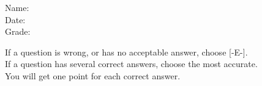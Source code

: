 \documentclass[11pt,fleqn]{article}
\begin{document}
\pagestyle{fancy}

\vspace*{-1in}
\begin{flushright}
Name: \uline{\mbox{\hspace*{2in}}} \\[2ex]
Date: \uline{\mbox{\hspace*{2in}}} \\[2ex]
Grade: \uline{\mbox{\hspace*{2in}}}
\end{flushright}

\vspace*{2ex}

If a question is wrong, or has no acceptable answer,
choose [-E-].
\\
If a question has several correct answers, choose the most
accurate.
\\
You will get one point for each correct answer.
\end{document}
